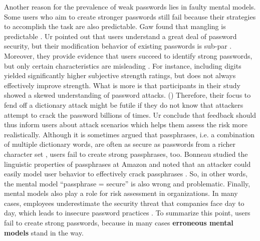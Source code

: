 	Another reason for the prevalence of weak passwords lies in faulty mental models. Some users who aim to create stronger passwords still fail because their strategies to accomplish the task are also predictable. Gaw \etal found that mangling is predictable \cite{Gaw2005ReuseRecycle}. Ur \etal pointed out that users understand a great deal of password security, but their modification behavior of existing passwords is sub-par \cite{Ur2015PWCreationLab}. Moreover, they provide evidence that users succeed to identify strong passwords, but only certain characteristics are misleading \cite{Ur2016PerceptionsPassword}. For instance, including digits yielded significantly higher subjective strength ratings, but does not always effectively improve strength. What is more is that participants in their study showed a skewed understanding of password attacks. () Therefore, their focus to fend off a dictionary attack might be futile if they do not know that attackers attempt to crack the password billions of times. Ur \etal conclude that feedback should thus inform users about attack scenarios which helps them assess the risk more realistically. Although it is sometimes argued that passphrases, i.e. a combination of multiple dictionary words, are often as secure as passwords from a richer character set \cite{Shay2012CorrectHorseBatteryStaple}, users fail to create strong passphrases, too. Bonneau studied the linguistic properties of passphrases at Amazon and noted that an attacker could easily model user behavior to effectively crack passphrases \cite{Bonneau2012LinguisticProperties}. So, in other words, the mental model ``passphrase = secure'' is also wrong and problematic. Finally, mental models also play a role for risk assessment in organizations. In many cases, employees underestimate the security threat that companies face day to day, which leads to insecure password practices \cite{Adams1999UsersEnemy, Weirich2001PrettyGoodPersuasion}. To summarize this point, users fail to create strong passwords, because in many cases \textbf{erroneous mental models} stand in the way.
	
